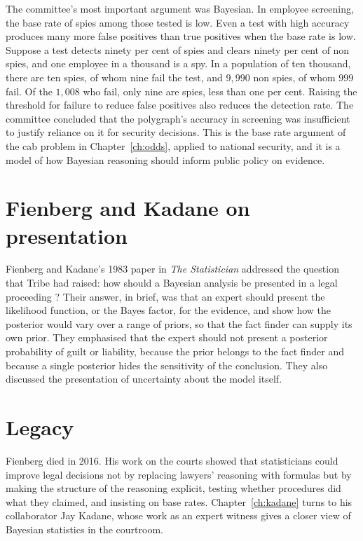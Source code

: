 The committee's most important argument was Bayesian. In employee screening, the base rate of spies among those tested is low. Even a test with high accuracy produces many more false positives than true positives when the base rate is low. Suppose a test detects ninety per cent of spies and clears ninety per cent of non spies, and one employee in a thousand is a spy. In a population of ten thousand, there are ten spies, of whom nine fail the test, and $9{,}990$ non spies, of whom $999$ fail. Of the $1{,}008$ who fail, only nine are spies, less than one per cent. Raising the threshold for failure to reduce false positives also reduces the detection rate. The committee concluded that the polygraph's accuracy in screening was insufficient to justify reliance on it for security decisions. This is the base rate argument of the cab problem in Chapter~\ref{ch:odds}, applied to national security, and it is a model of how Bayesian reasoning should inform public policy on evidence.

\section{Fienberg and Kadane on presentation}

Fienberg and Kadane's 1983 paper in \emph{The Statistician} addressed the question that Tribe had raised: how should a Bayesian analysis be presented in a legal proceeding \citep{fienberg_kadane1983}? Their answer, in brief, was that an expert should present the likelihood function, or the Bayes factor, for the evidence, and show how the posterior would vary over a range of priors, so that the fact finder can supply its own prior. They emphasised that the expert should not present a posterior probability of guilt or liability, because the prior belongs to the fact finder and because a single posterior hides the sensitivity of the conclusion. They also discussed the presentation of uncertainty about the model itself.

\section{Legacy}

Fienberg died in 2016. His work on the courts showed that statisticians could improve legal decisions not by replacing lawyers' reasoning with formulas but by making the structure of the reasoning explicit, testing whether procedures did what they claimed, and insisting on base rates. Chapter~\ref{ch:kadane} turns to his collaborator Jay Kadane, whose work as an expert witness gives a closer view of Bayesian statistics in the courtroom.

